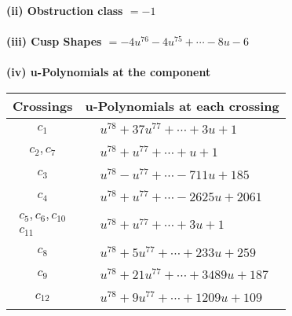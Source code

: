 \documentclass[1p]{elsarticle_modified}
\theoremstyle{definition}
\begin{document}
\flushleft \textbf{(ii) Obstruction class $= -1$}\\~\\
\flushleft \textbf{(iii) Cusp Shapes $= -4 u^{76}-4 u^{75}+\cdots-8 u-6$}\\~\\
\newpage\renewcommand{\arraystretch}{1}
\flushleft \textbf{(iv) u-Polynomials at the component}\newline \\
\begin{tabular}{m{50pt}|m{274pt}}
Crossings & \hspace{64pt}u-Polynomials at each crossing \\
\hline $$\begin{aligned}c_{1}\end{aligned}$$&$\begin{aligned}
&u^{78}+37 u^{77}+\cdots+3 u+1
\end{aligned}$\\
\hline $$\begin{aligned}c_{2},c_{7}\end{aligned}$$&$\begin{aligned}
&u^{78}+u^{77}+\cdots+u+1
\end{aligned}$\\
\hline $$\begin{aligned}c_{3}\end{aligned}$$&$\begin{aligned}
&u^{78}- u^{77}+\cdots-711 u+185
\end{aligned}$\\
\hline $$\begin{aligned}c_{4}\end{aligned}$$&$\begin{aligned}
&u^{78}+u^{77}+\cdots-2625 u+2061
\end{aligned}$\\
\hline $$\begin{aligned}c_{5},c_{6},c_{10}\\c_{11}\end{aligned}$$&$\begin{aligned}
&u^{78}+u^{77}+\cdots+3 u+1
\end{aligned}$\\
\hline $$\begin{aligned}c_{8}\end{aligned}$$&$\begin{aligned}
&u^{78}+5 u^{77}+\cdots+233 u+259
\end{aligned}$\\
\hline $$\begin{aligned}c_{9}\end{aligned}$$&$\begin{aligned}
&u^{78}+21 u^{77}+\cdots+3489 u+187
\end{aligned}$\\
\hline $$\begin{aligned}c_{12}\end{aligned}$$&$\begin{aligned}
&u^{78}+9 u^{77}+\cdots+1209 u+109
\end{aligned}$\\
\hline
\end{tabular}\\~\\
\end{document}
